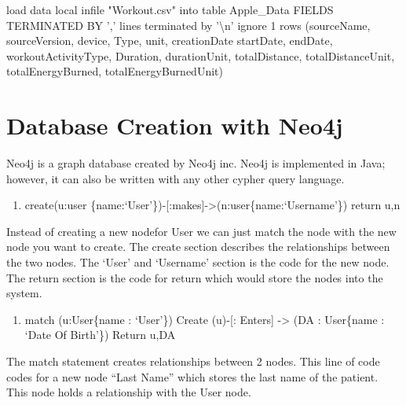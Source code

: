 \documentclass[]{book}
\newenvironment{Shaded}{\begin{snugshade}}{\end{snugshade}}
\newcommand{\DecValTok}[1]{\textcolor[rgb]{0.00,0.00,0.81}{#1}}
\newcommand{\CharTok}[1]{\textcolor[rgb]{0.31,0.60,0.02}{#1}}
\newcommand{\StringTok}[1]{\textcolor[rgb]{0.31,0.60,0.02}{#1}}
\newcommand{\NormalTok}[1]{#1}
\providecommand{\tightlist}{%
  \setlength{\itemsep}{0pt}\setlength{\parskip}{0pt}}
\begin{document}
\begin{Shaded}
\begin{Highlighting}[]
\NormalTok{load data local infile }
\StringTok{"Workout.csv"}\NormalTok{ into table Apple_Data}
\NormalTok{FIELDS TERMINATED BY }\StringTok{','} 
\NormalTok{     lines terminated by }\StringTok{'}\CharTok{\textbackslash{}n}\StringTok{'}
\NormalTok{     ignore }\DecValTok{1}\NormalTok{ rows}
\NormalTok{     (sourceName, }
\NormalTok{sourceVersion, device, }
\NormalTok{Type,}
\NormalTok{unit,}
\NormalTok{creationDate}
\NormalTok{startDate,}
\NormalTok{endDate,}
\NormalTok{workoutActivityType,}
\NormalTok{Duration,}
\NormalTok{durationUnit, }
\NormalTok{totalDistance,}
\NormalTok{totalDistanceUnit,}
\NormalTok{totalEnergyBurned,}
\NormalTok{totalEnergyBurnedUnit)}
\end{Highlighting}
\end{Shaded}

\section{Database Creation with
Neo4j}\label{database-creation-with-neo4j}

Neo4j is a graph database created by Neo4j inc. Neo4j is implemented in
Java; however, it can also be written with any other cypher query
language.

\begin{enumerate}
\def\labelenumi{\arabic{enumi}.}
\tightlist
\item
  create(u:user
  \{name:`User'\})-{[}:makes{]}-\textgreater{}(n:user\{name:`Username'\})
  return u,n
\end{enumerate}

Instead of creating a new nodefor User we can just match the node with
the new node you want to create. The create section describes the
relationships between the two nodes. The `User' and `Username' section
is the code for the new node. The return section is the code for return
which would store the nodes into the system.

\begin{enumerate}
\def\labelenumi{\arabic{enumi}.}
\setcounter{enumi}{1}
\tightlist
\item
  match (u:User\{name : `User'\}) Create (u)-{[}: Enters{]}
  -\textgreater{} (DA : User\{name : `Date Of Birth'\}) Return u,DA
\end{enumerate}

The match statement creates relationships between 2 nodes. This line of
code codes for a new node ``Last Name'' which stores the last name of
the patient. This node holds a relationship with the User node.
\end{document}
